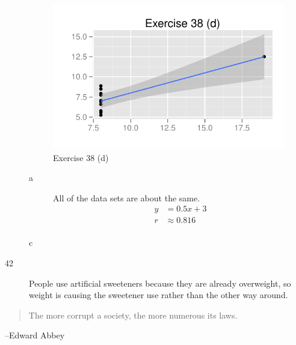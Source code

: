 \documentclass[letterpaper, landscape]{exam}
\begin{document}
\begin{description}
        \begin{figure}[H]
          \centering
          \includegraphics{figures/ex38d.pdf}
          \caption{Exercise 38 (d)}
        \end{figure}

        \begin{description}
          \item[a]
            All of the data sets are about the same.
            \begin{align*}
              y & = 0.5 x + 3 \\
              r & \approx 0.816 \\
            \end{align*}

          \item[c]
      \end{description}

      \item[42]
        People use artificial sweeteners because they are already overweight, so
        weight is causing the sweetener use rather than the other way around.

    \end{description}

  \else
    \vspace{10 cm}
    \begin{quote}
      \begin{em}
        The more corrupt a society, the more numerous its laws.
      \end{em}
    \end{quote}
    \hspace{1 cm} --Edward Abbey
  \fi
\end{document}
